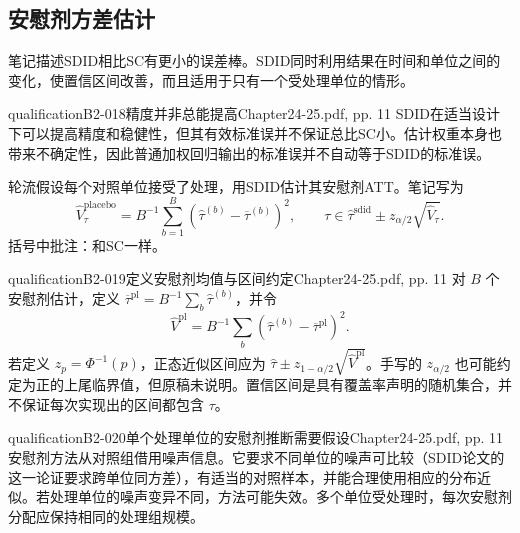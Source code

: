 \subsection{安慰剂方差估计}
笔记描述SDID相比SC有更小的误差棒。SDID同时利用结果在时间和单位之间的变化，使置信区间改善，而且适用于只有一个受处理单位的情形。
\begin{reviewnote}{qualification}{B2-018}{精度并非总能提高}{Chapter24-25.pdf, pp. 11}
SDID在适当设计下可以提高精度和稳健性，但其有效标准误并不保证总比SC小。估计权重本身也带来不确定性，因此普通加权回归输出的标准误并不自动等于SDID的标准误。
\par{}
\end{reviewnote}


轮流假设每个对照单位接受了处理，用SDID估计其安慰剂ATT。笔记写为
\[
\widehat V_{\tau}^{\mathrm{placebo}}
=B^{-1}\sum_{b=1}^{B}
\left(\widehat\tau^{(b)}-\overline\tau^{(b)}\right)^2,
\qquad
\tau\in\widehat\tau^{\mathrm{sdid}}
\pm z_{\alpha/2}\sqrt{\widehat V_\tau}.
\]
 括号中批注：和SC一样。
\begin{reviewnote}{qualification}{B2-019}{定义安慰剂均值与区间约定}{Chapter24-25.pdf, pp. 11}
对 \(B\) 个安慰剂估计，定义 \(\overline\tau^{\mathrm{pl}}=B^{-1}\sum_b\widehat\tau^{(b)}\)，并令
\[
\widehat V^{\mathrm{pl}}=B^{-1}\sum_b(\widehat\tau^{(b)}-\overline\tau^{\mathrm{pl}})^2.
\]
若定义 \(z_p=\Phi^{-1}(p)\)，正态近似区间应为 \(\widehat\tau\pm z_{1-\alpha/2}\sqrt{\widehat V^{\mathrm{pl}}}\)。手写的 \(z_{\alpha/2}\) 也可能约定为正的上尾临界值，但原稿未说明。置信区间是具有覆盖率声明的随机集合，并不保证每次实现出的区间都包含 \(\tau\)。
\par{}
\end{reviewnote}
\begin{reviewnote}{qualification}{B2-020}{单个处理单位的安慰剂推断需要假设}{Chapter24-25.pdf, pp. 11}
安慰剂方法从对照组借用噪声信息。它要求不同单位的噪声可比较（SDID论文的这一论证要求跨单位同方差），有适当的对照样本，并能合理使用相应的分布近似。若处理单位的噪声变异不同，方法可能失效。多个单位受处理时，每次安慰剂分配应保持相同的处理组规模。
\par{}
\end{reviewnote}


